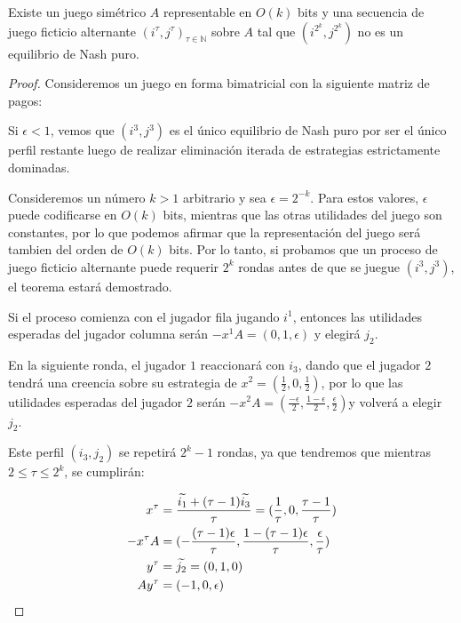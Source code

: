 \begin{theorem} \label{teorema:afp:velocidad:simetricos}
    Existe un juego simétrico $A$ representable en $O(k)$ bits y una secuencia de juego ficticio alternante $(i^\tau, j^\tau)_{\tau \in \mathbb{N}}$ sobre $A$ tal que $(i^{2^k}, j^{2^k})$ no es un equilibrio de Nash puro.
\end{theorem}
\begin{proof}
    Consideremos un juego en forma bimatricial con la siguiente matriz de pagos:

    

    Si $\epsilon < 1$, vemos que $(i^3, j^3)$ es el único equilibrio de Nash puro por ser el único perfil restante luego de realizar eliminación iterada de estrategias estrictamente dominadas. 

    Consideremos un número $k > 1$ arbitrario y sea $\epsilon = 2^{-k}$. Para estos valores, $\epsilon$ puede codificarse en $O(k)$ bits, mientras que las otras utilidades del juego son constantes, por lo que podemos afirmar que la representación del juego será tambien del orden de  $O(k)$ bits. Por lo tanto, si probamos que un proceso de juego ficticio alternante puede requerir $2^k$ rondas antes de que se juegue $(i^3, j^3)$, el teorema estará demostrado.

    Si el proceso comienza con el jugador fila jugando $i^1$, entonces las utilidades esperadas del jugador columna serán $-x^1A = (0, 1, \epsilon)$ y elegirá $j_2$.

    En la siguiente ronda, el jugador $1$ reaccionará con $i_3$, dando que el jugador $2$ tendrá una creencia sobre su estrategia de $x^2 = (\frac{1}{2},0,\frac{1}{2})$, por lo que las utilidades esperadas del jugador $2$ serán $-x^2A = (\frac{-\epsilon}{2}, \frac{1-\epsilon}{2}, \frac{\epsilon}{2})$y volverá a elegir $j_2$.

    Este perfil $(i_3, j_2)$ se repetirá $2^k - 1$ rondas, ya que tendremos que mientras $2 \le \tau \le 2^k$, se cumplirán:

    \begin{align*}
        x^\tau     &= \frac{\widetilde{i_1} + (\tau - 1) \widetilde{i_3}}{\tau} = (\frac{1}{\tau}, 0,\frac{\tau - 1}{\tau}) \\
        -x^{\tau}A &= (-\frac{(\tau-1) \epsilon}{\tau}, \frac{1-(\tau-1)\epsilon}{\tau}, \frac{\epsilon}{\tau}) \\
        y^\tau     &= \widetilde{j_2} = (0, 1, 0) \\
        Ay^\tau    &= (- 1, 0, \epsilon) \\
    \end{align*}


\end{proof}
